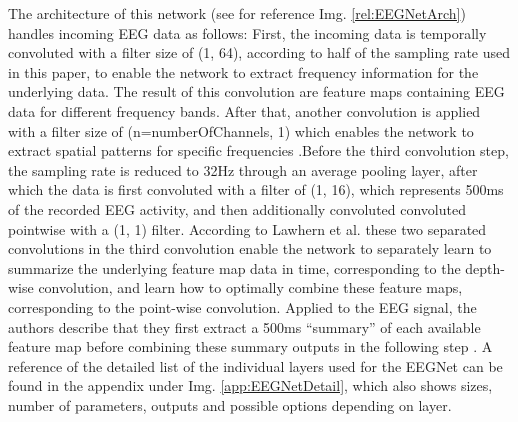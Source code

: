 The architecture of this network (see for reference Img. \ref{rel:EEGNetArch}) handles incoming EEG data as follows: %
First, the incoming data is temporally convoluted with a filter size of (1, 64), according to half of the sampling rate used in this paper, to enable the network to extract frequency information for the underlying data. The result of this convolution are feature maps containing EEG data for different frequency bands. %
After that, another convolution is applied with a filter size of (n=numberOfChannels, 1) %
which enables the network to extract spatial patterns for specific frequencies \cite{lawhern-2018}.Before the third convolution step, the sampling rate is reduced to 32Hz through an average pooling layer, after which the data is first convoluted with a filter of (1, 16), which represents 500ms of the recorded EEG activity, and then additionally convoluted convoluted pointwise with a (1, 1) filter. According to Lawhern et al. these two separated convolutions in the third convolution enable the network to separately learn to summarize the underlying feature map data in time, corresponding to the depth-wise convolution, and learn how to optimally combine these feature maps, corresponding to the point-wise convolution. Applied to the EEG signal, the authors describe that they first extract a 500ms ``summary'' of each available feature map before combining these summary outputs in the following step \cite{lawhern-2018}. %
A reference of the detailed list of the individual layers used for the EEGNet can be found in the appendix under Img. \ref{app:EEGNetDetail}, which also shows sizes, number of parameters, outputs and possible options depending on layer. %


